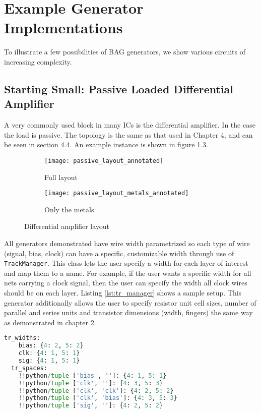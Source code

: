 \chapter{Example Generator Implementations}
To illustrate a few possibilities of BAG generators, we show various circuits of increasing complexity. 
\section{Starting Small: Passive Loaded Differential Amplifier}
A very commonly used block in many ICs is the differential amplifier. In the case the load is passive. The topology is the same as that used in Chapter 4, and can be seen in section 4.4. An example instance is shown in figure \ref{fig:passive_amp}.
\begin{figure}[h]
\centering
\begin{subfigure}{.8\linewidth}
  \centering
  \texttt{[image: passive\_layout\_annotated]}
  \caption{Full layout}
  \label{fig:sfig1}
\end{subfigure}
\begin{subfigure}{.8\linewidth}
  \centering
\texttt{[image: passive\_layout\_metals\_annotated]}
  \caption{Only the metals}
  \label{fig:sfig2}
\end{subfigure}
\caption{Differential amplifier layout}
\label{fig:passive_amp}
\end{figure}
All generators demonstrated have wire width parametrized so each type of wire (signal, bias, clock) can have a specific, customizable width through use of \texttt{TrackManager}. This class lets the user specify a width for each layer of interest and map them to a name. For example, if the user wants a specific width for all nets carrying a clock signal, then the user can specify the width all clock wires should be on each layer. Listing \ref{lst:tr_manager} shows a sample setup. This generator additionally allows the user to specify resistor unit cell sizes, number of parallel and series units and transistor dimensions (width, fingers) the same way as demonstrated in chapter 2.
\begin{lstlisting}[language=Python, caption=Track manager setup, label={lst:tr_manager}, float]
tr_widths:
    bias: {4: 2, 5: 2}
    clk: {4: 1, 5: 1}
    sig: {4: 1, 5: 1}
  tr_spaces:
    !!python/tuple ['bias', '']: {4: 1, 5: 1}
    !!python/tuple ['clk', '']: {4: 3, 5: 3}
    !!python/tuple ['clk', 'clk']: {4: 2, 5: 2}
    !!python/tuple ['clk', 'bias']: {4: 3, 5: 3}
    !!python/tuple ['sig', '']: {4: 2, 5: 2}
\end{lstlisting}

